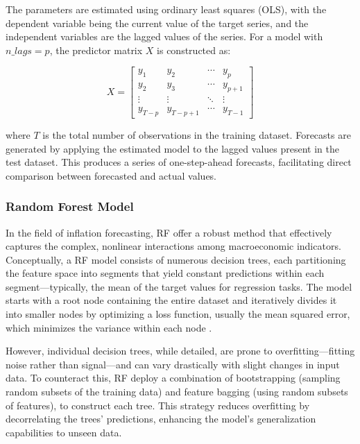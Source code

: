 The parameters are estimated using ordinary least squares (OLS), with the dependent variable being the current value of the target series, and the independent variables are the lagged values of the series. For a model with $n\_lags = p$, the predictor matrix $X$ is constructed as:

\begin{equation}
    X = \begin{bmatrix}
    y_{1} & y_{2} & \cdots & y_{p} \\
    y_{2} & y_{3} & \cdots & y_{p+1} \\
    \vdots & \vdots & \ddots & \vdots \\
    y_{T-p} & y_{T-p+1} & \cdots & y_{T-1}
    \end{bmatrix}
\end{equation}

where $T$ is the total number of observations in the training dataset. Forecasts are generated by applying the estimated model to the lagged values present in the test dataset. This produces a series of one-step-ahead forecasts, facilitating direct comparison between forecasted and actual values.


\subsubsection{Random Forest Model}

In the field of inflation forecasting, RF offer a robust method that effectively captures the complex, nonlinear interactions among macroeconomic indicators. Conceptually, a RF model consists of numerous decision trees, each partitioning the feature space into segments that yield constant predictions within each segment—typically, the mean of the target values for regression tasks. The model starts with a root node containing the entire dataset and iteratively divides it into smaller nodes by optimizing a loss function, usually the mean squared error, which minimizes the variance within each node \autocite{Breiman2001RandomForests}.

However, individual decision trees, while detailed, are prone to overfitting—fitting noise rather than signal—and can vary drastically with slight changes in input data. To counteract this, RF deploy a combination of bootstrapping (sampling random subsets of the training data) and feature bagging (using random subsets of features), to construct each tree. This strategy reduces overfitting by decorrelating the trees’ predictions, enhancing the model's generalization capabilities to unseen data.

